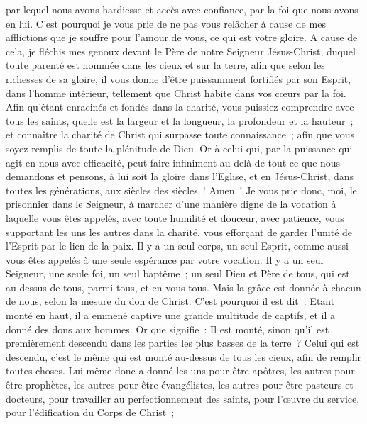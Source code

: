\begin{multicols}{2}
par lequel nous avons hardiesse et accès avec confiance, par la foi que nous avons en lui.
C'est pourquoi je vous prie de ne pas vous relâcher à cause de mes afflictions que je souffre pour l'amour de vous, ce qui est votre gloire.
A cause de cela, je fléchis mes genoux devant le Père de notre Seigneur Jésus-Christ,
duquel toute parenté est nommée dans les cieux et sur la terre,
afin que selon les richesses de sa gloire, il vous donne d'être puissamment fortifiés par son Esprit, dans l'homme intérieur,
tellement que Christ habite dans vos cœurs par la foi. Afin qu'étant enracinés et fondés dans la charité,
vous puissiez comprendre avec tous les saints, quelle est la largeur et la longueur, la profondeur et la hauteur~;
et connaître la charité de Christ qui surpasse toute connaissance~; afin que vous soyez remplis de toute la plénitude de Dieu.
Or à celui qui, par la puissance qui agit en nous avec efficacité, peut faire infiniment au-delà de tout ce que nous demandons et pensons,
à lui soit la gloire dans l'Eglise, et en Jésus-Christ, dans toutes les générations, aux siècles des siècles~! Amen~!
\VerseOne{}Je vous prie donc, moi, le prisonnier dans le Seigneur, à marcher d'une manière digne de la vocation à laquelle vous êtes appelés,
avec toute humilité et douceur, avec patience, vous supportant les uns les autres dans la charité,
vous efforçant de garder l'unité de l'Esprit par le lien de la paix.
Il y a un seul corps, un seul Esprit, comme aussi vous êtes appelés à une seule espérance par votre vocation.
Il y a un seul Seigneur, une seule foi, un seul baptême~;
un seul Dieu et Père de tous, qui est au-dessus de tous, parmi tous, et en vous tous.
Mais la grâce est donnée à chacun de nous, selon la mesure du don de Christ.
C'est pourquoi il est dit~: Etant monté en haut, il a emmené captive une grande multitude de captifs, et il a donné des dons aux hommes.
Or que signifie~: Il est monté, sinon qu'il est premièrement descendu dans les parties les plus basses de la terre~?
Celui qui est descendu, c'est le même qui est monté au-dessus de tous les cieux, afin de remplir toutes choses.
Lui-même donc a donné les uns pour être apôtres, les autres pour être prophètes, les autres pour être évangélistes, les autres pour être pasteurs et docteurs,
pour travailler au perfectionnement des saints, pour l'œuvre du service, pour l'édification du Corps de Christ~;

\end{multicols}
